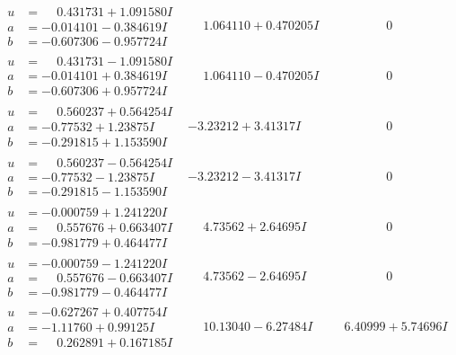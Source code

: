 \documentclass[1p]{elsarticle_modified}
\theoremstyle{definition}
\begin{document}
$$\begin{array}{c|c|c}
\begin{aligned}
u &= \phantom{-}0.431731 + 1.091580 I \\
a &= -0.014101 - 0.384619 I \\
b &= -0.607306 - 0.957724 I\end{aligned}
 & \phantom{-}1.064110 + 0.470205 I & \phantom{-0.000000 } 0 \\ \hline\begin{aligned}
u &= \phantom{-}0.431731 - 1.091580 I \\
a &= -0.014101 + 0.384619 I \\
b &= -0.607306 + 0.957724 I\end{aligned}
 & \phantom{-}1.064110 - 0.470205 I & \phantom{-0.000000 } 0 \\ \hline\begin{aligned}
u &= \phantom{-}0.560237 + 0.564254 I \\
a &= -0.77532 + 1.23875 I \\
b &= -0.291815 + 1.153590 I\end{aligned}
 & -3.23212 + 3.41317 I & \phantom{-0.000000 } 0 \\ \hline\begin{aligned}
u &= \phantom{-}0.560237 - 0.564254 I \\
a &= -0.77532 - 1.23875 I \\
b &= -0.291815 - 1.153590 I\end{aligned}
 & -3.23212 - 3.41317 I & \phantom{-0.000000 } 0 \\ \hline\begin{aligned}
u &= -0.000759 + 1.241220 I \\
a &= \phantom{-}0.557676 + 0.663407 I \\
b &= -0.981779 + 0.464477 I\end{aligned}
 & \phantom{-}4.73562 + 2.64695 I & \phantom{-0.000000 } 0 \\ \hline\begin{aligned}
u &= -0.000759 - 1.241220 I \\
a &= \phantom{-}0.557676 - 0.663407 I \\
b &= -0.981779 - 0.464477 I\end{aligned}
 & \phantom{-}4.73562 - 2.64695 I & \phantom{-0.000000 } 0 \\ \hline\begin{aligned}
u &= -0.627267 + 0.407754 I \\
a &= -1.11760 + 0.99125 I \\
b &= \phantom{-}0.262891 + 0.167185 I\end{aligned}
 & \phantom{-}10.13040 - 6.27484 I & \phantom{-}6.40999 + 5.74696 I \\ \hline\begin{aligned}

\end{aligned}
\end{array}$$
\end{document}

